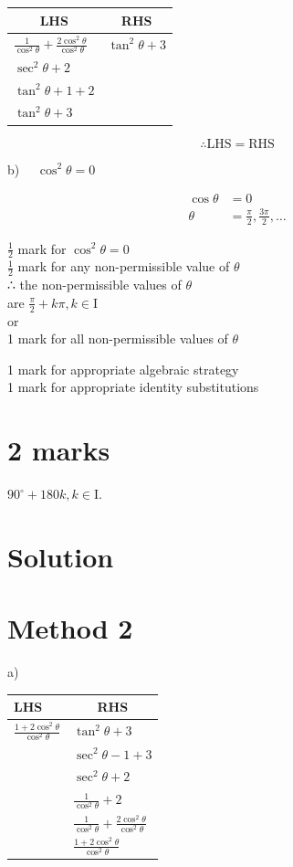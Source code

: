 \documentclass[10pt]{article}
\begin{document}
\begin{center}
\begin{tabular}{l|c}
\multicolumn{1}{c|}{LHS} & RHS \\
\hline
$\frac{1}{\cos ^{2} \theta}+\frac{2 \cos ^{2} \theta}{\cos ^{2} \theta}$ & $\tan ^{2} \theta+3$ \\
$\sec ^{2} \theta+2$ &  \\
$\tan ^{2} \theta+1+2$ &  \\
$\tan ^{2} \theta+3$ &  \\
\end{tabular}
\end{center}

$$
\therefore \mathrm{LHS}=\mathrm{RHS}
$$

b) $\quad \cos ^{2} \theta=0$

$$
\begin{aligned}
\cos \theta & =0 \\
\theta & =\frac{\pi}{2}, \frac{3 \pi}{2}, \ldots
\end{aligned}
$$

$\frac{1}{2}$ mark for $\cos ^{2} \theta=0$\\
$\frac{1}{2}$ mark for any non-permissible value of $\theta$\\
∴ the non-permissible values of $\theta$\\
are $\frac{\pi}{2}+k \pi, k \in \mathrm{I}$\\
or\\
1 mark for all non-permissible values of $\theta$

1 mark for appropriate algebraic strategy\\
1 mark for appropriate identity substitutions

\section*{2 marks}
$90^{\circ}+180 k, k \in \mathrm{I}$.

\section*{Solution}
\section*{Method 2}
a)

\begin{center}
\begin{tabular}{l|l}
LHS & \multicolumn{1}{|c}{RHS} \\
\hline
$\frac{1+2 \cos ^{2} \theta}{\cos ^{2} \theta}$ & $\tan ^{2} \theta+3$ \\
 & $\sec ^{2} \theta-1+3$ \\
 & $\sec ^{2} \theta+2$ \\
 & $\frac{1}{\cos ^{2} \theta}+2$ \\
 & $\frac{1}{\cos ^{2} \theta}+\frac{2 \cos ^{2} \theta}{\cos ^{2} \theta}$ \\
 & $\frac{1+2 \cos ^{2} \theta}{\cos ^{2} \theta}$ \\
\end{tabular}
\end{center}
\end{document}
